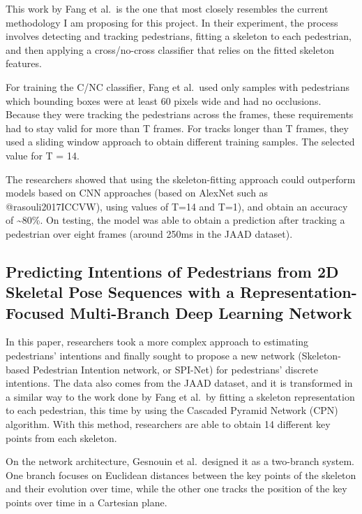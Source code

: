 \documentclass[
]{article}
\begin{document}
This work by Fang et al.~is the one that most closely resembles the
current methodology I am proposing for this project. In their
experiment, the process involves detecting and tracking pedestrians,
fitting a skeleton to each pedestrian, and then applying a
cross/no-cross classifier that relies on the fitted skeleton features.

For training the C/NC classifier, Fang et al.~used only samples with
pedestrians which bounding boxes were at least 60 pixels wide and had no
occlusions. Because they were tracking the pedestrians across the
frames, these requirements had to stay valid for more than T frames. For
tracks longer than T frames, they used a sliding window approach to
obtain different training samples. The selected value for T = 14.

The researchers showed that using the skeleton-fitting approach could
outperform models based on CNN approaches (based on AlexNet such as
@rasouli2017ICCVW), using values of T=14 and T=1), and obtain an
accuracy of \textasciitilde80\%. On testing, the model was able to
obtain a prediction after tracking a pedestrian over eight frames
(around 250ms in the JAAD dataset).

\hypertarget{predicting-intentions-of-pedestrians-from-2d-skeletal-pose-sequences-with-a-representation-focused-multi-branch-deep-learning-network}{%
\subsection{Predicting Intentions of Pedestrians from 2D Skeletal Pose
Sequences with a Representation-Focused Multi-Branch Deep Learning
Network}\label{predicting-intentions-of-pedestrians-from-2d-skeletal-pose-sequences-with-a-representation-focused-multi-branch-deep-learning-network}}

In this paper, researchers took a more complex approach to estimating
pedestrians' intentions and finally sought to propose a new network
(Skeleton-based Pedestrian Intention network, or SPI-Net) for
pedestrians' discrete intentions. The data also comes from the JAAD
dataset, and it is transformed in a similar way to the work done by Fang
et al.~by fitting a skeleton representation to each pedestrian, this
time by using the Cascaded Pyramid Network (CPN) algorithm. With this
method, researchers are able to obtain 14 different key points from each
skeleton.

On the network architecture, Gesnouin et al.~designed it as a two-branch
system. One branch focuses on Euclidean distances between the key points
of the skeleton and their evolution over time, while the other one
tracks the position of the key points over time in a Cartesian plane.
\end{document}
